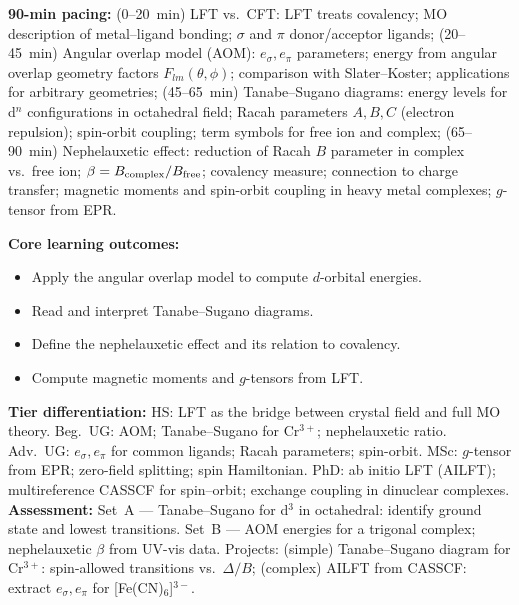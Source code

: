 \documentclass[11pt,a4paper]{article}
\begin{document}
\medskip

\begin{tcolorbox}[chembox, title={Module~III.3 / L09: Ligand Field Theory}]
\textbf{90-min pacing:} (0--20~min) LFT vs.\ CFT: LFT treats covalency; MO description of metal--ligand bonding; $\sigma$ and $\pi$ donor/acceptor ligands; (20--45~min) Angular overlap model (AOM): $e_\sigma,e_\pi$ parameters; energy from angular overlap geometry factors $F_{lm}(\theta,\phi)$; comparison with Slater--Koster; applications for arbitrary geometries; (45--65~min) Tanabe--Sugano diagrams: energy levels for d$^n$ configurations in octahedral field; Racah parameters $A,B,C$ (electron repulsion); spin-orbit coupling; term symbols for free ion and complex; (65--90~min) Nephelauxetic effect: reduction of Racah $B$ parameter in complex vs.\ free ion; $\beta=B_{\rm complex}/B_{\rm free}$; covalency measure; connection to charge transfer; magnetic moments and spin-orbit coupling in heavy metal complexes; $g$-tensor from EPR.

\medskip\textbf{Core learning outcomes:}
\begin{itemize}[leftmargin=1.4em,topsep=2pt,itemsep=1pt]
  \item Apply the angular overlap model to compute $d$-orbital energies.
  \item Read and interpret Tanabe--Sugano diagrams.
  \item Define the nephelauxetic effect and its relation to covalency.
  \item Compute magnetic moments and $g$-tensors from LFT.
\end{itemize}
\medskip\textbf{Tier differentiation:}
HS: LFT as the bridge between crystal field and full MO theory.
Beg.\ UG: AOM; Tanabe--Sugano for Cr$^{3+}$; nephelauxetic ratio.
Adv.\ UG: $e_\sigma,e_\pi$ for common ligands; Racah parameters; spin-orbit.
MSc: $g$-tensor from EPR; zero-field splitting; spin Hamiltonian.
PhD: ab initio LFT (AILFT); multireference CASSCF for spin--orbit; exchange coupling in dinuclear complexes.
\medskip\textbf{Assessment:}
Set~A --- Tanabe--Sugano for d$^3$ in octahedral: identify ground state and lowest transitions.
Set~B --- AOM energies for a trigonal complex; nephelauxetic $\beta$ from UV-vis data.
Projects: (simple) Tanabe--Sugano diagram for Cr$^{3+}$: spin-allowed transitions vs.\ $\Delta/B$; (complex) AILFT from CASSCF: extract $e_\sigma,e_\pi$ for [Fe(CN)$_6$]$^{3-}$.
\end{tcolorbox}

\medskip
\end{document}
